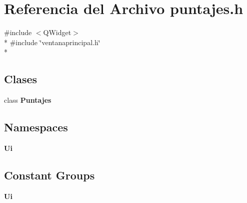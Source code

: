\section{Referencia del Archivo puntajes.\-h}
\label{puntajes_8h}
{\ttfamily \#include $<$Q\-Widget$>$}\\*
{\ttfamily \#include \char`\"{}ventanaprincipal.\-h\char`\"{}}\\*
\subsection*{Clases}
\begin{DoxyCompactItemize}
\item 
class {\bf Puntajes}
\end{DoxyCompactItemize}
\subsection*{Namespaces}
\begin{DoxyCompactItemize}
\item 
{\bf Ui}
\end{DoxyCompactItemize}
\subsection*{Constant Groups}
\begin{DoxyCompactItemize}
\item 
{\bf Ui}
\end{DoxyCompactItemize}
